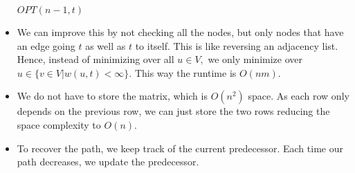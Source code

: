 \documentclass[a4paper,12pt]{article}
\begin{document}
\begin{itemize}
\begin{algorithmic}[1]
            \EndFor
        \EndFor
        \State \Return $OPT(n-1,t)$
    \end{algorithmic}
    \item We can improve this by not checking all the nodes, but only nodes that have an edge going  $t$ as well as $t$ to itself. This is like reversing an adjacency list. Hence, instead of minimizing over all $u\in V,$ we only minimize over $u\in\{v\in V|w(u,t)<\infty\}.$ This way the runtime is $O(nm).$
    \item We do not have to store the matrix, which is $O(n^2)$ space. As each row only depends on the previous row, we can just store the two rows reducing the space complexity to $O(n).$
    \item To recover the path, we keep track of the current predecessor. Each time our path decreases, we update the predecessor.
\end{itemize}
\end{document}
